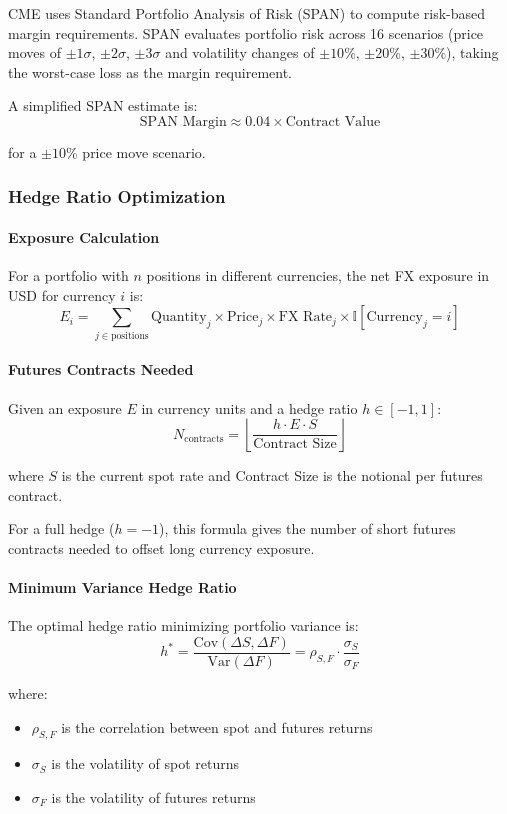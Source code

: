 CME uses Standard Portfolio Analysis of Risk (SPAN) to compute risk-based margin requirements. SPAN evaluates portfolio risk across 16 scenarios (price moves of $\pm1\sigma$, $\pm2\sigma$, $\pm3\sigma$ and volatility changes of $\pm10\%$, $\pm20\%$, $\pm30\%$), taking the worst-case loss as the margin requirement.

A simplified SPAN estimate is:
\[
\text{SPAN Margin} \approx 0.04 \times \text{Contract Value}
\]

for a $\pm10\%$ price move scenario.

\subsubsection{Hedge Ratio Optimization}

\paragraph{Exposure Calculation}

For a portfolio with $n$ positions in different currencies, the net FX exposure in USD for currency $i$ is:
\[
E_i = \sum_{j \in \text{positions}} \text{Quantity}_j \times \text{Price}_j \times \text{FX Rate}_j \times \mathbb{I}[\text{Currency}_j = i]
\]

\paragraph{Futures Contracts Needed}

Given an exposure $E$ in currency units and a hedge ratio $h \in [-1, 1]$:
\[
N_{\text{contracts}} = \left\lfloor \frac{h \cdot E \cdot S}{\text{Contract Size}} \right\rfloor
\]

where $S$ is the current spot rate and Contract Size is the notional per futures contract.

For a full hedge ($h = -1$), this formula gives the number of short futures contracts needed to offset long currency exposure.

\paragraph{Minimum Variance Hedge Ratio}

The optimal hedge ratio minimizing portfolio variance is:
\[
h^* = \frac{\text{Cov}(\Delta S, \Delta F)}{\text{Var}(\Delta F)} = \rho_{S,F} \cdot \frac{\sigma_S}{\sigma_F}
\]

where:
\begin{itemize}
  \item $\rho_{S,F}$ is the correlation between spot and futures returns
  \item $\sigma_S$ is the volatility of spot returns
  \item $\sigma_F$ is the volatility of futures returns
\end{itemize}

